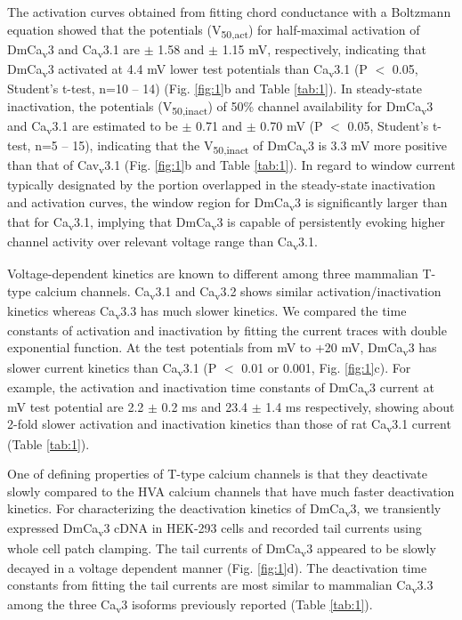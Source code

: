 The activation curves obtained from fitting chord conductance with a Boltzmann equation showed that the potentials (V\textsubscript{50,act}) for half-maximal activation of DmCa\textsubscript{v}3 and Ca\textsubscript{v}3.1 are  $\pm$ 1.58 and  $\pm$ 1.15 mV, respectively, indicating that DmCa\textsubscript{v}3 activated at 4.4 mV lower test potentials than Ca\textsubscript{v}3.1 (P $<$ 0.05, Student's t-test, n=10 -- 14) (Fig. \ref{fig:1}b and Table \ref{tab:1}).
In steady-state inactivation, the potentials (V\textsubscript{50,inact}) of 50\% channel availability for DmCa\textsubscript{v}3 and Ca\textsubscript{v}3.1 are estimated to be  $\pm$ 0.71 and  $\pm$ 0.70 mV (P $<$ 0.05, Student's t-test, n=5 -- 15), indicating that the V\textsubscript{50,inact} of DmCa\textsubscript{v}3 is 3.3 mV more positive than that of Cav\textsubscript{v}3.1 (Fig. \ref{fig:1}b and Table \ref{tab:1}).
In regard to window current typically designated by the portion overlapped in the steady-state inactivation and activation curves, the window region for DmCa\textsubscript{v}3 is significantly larger than that for Ca\textsubscript{v}3.1, implying that DmCa\textsubscript{v}3 is capable of persistently evoking higher channel activity over relevant voltage range than Ca\textsubscript{v}3.1.

Voltage-dependent kinetics are known to different among three mammalian T-type calcium channels\cite{klockner:1999aa}.
Ca\textsubscript{v}3.1 and Ca\textsubscript{v}3.2 shows similar activation/inactivation kinetics whereas Ca\textsubscript{v}3.3 has much slower kinetics.
We compared the time constants of activation and inactivation by fitting the current traces with double exponential function.
At the test potentials from  mV to +20 mV,  DmCa\textsubscript{v}3 has slower current kinetics than Ca\textsubscript{v}3.1 (P $<$ 0.01 or 0.001, Fig. \ref{fig:1}c).
For example, the activation and inactivation time constants of DmCa\textsubscript{v}3 current at  mV test potential are 2.2 $\pm$ 0.2 ms and 23.4 $\pm$ 1.4 ms respectively, showing about 2-fold slower activation and inactivation kinetics than those of rat Ca\textsubscript{v}3.1 current (Table \ref{tab:1}).

One of defining properties of T-type calcium channels is that they deactivate slowly compared to the HVA calcium channels that have much faster deactivation kinetics\cite{PerezReyes:1998gn, 10066244, 2419479}. 
For characterizing the deactivation kinetics of DmCa\textsubscript{v}3, we transiently expressed DmCa\textsubscript{v}3 cDNA in HEK-293 cells and recorded tail currents using whole cell patch clamping. 
The tail currents of DmCa\textsubscript{v}3 appeared to be slowly decayed in a voltage dependent manner (Fig. \ref{fig:1}d). 
The deactivation time constants from fitting the tail currents are most similar to mammalian Ca\textsubscript{v}3.3 among the three Ca\textsubscript{v}3 isoforms previously reported (Table \ref{tab:1}). 

